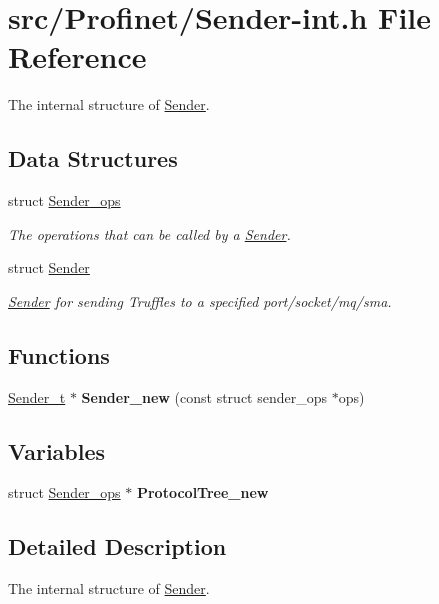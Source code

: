 \hypertarget{_sender-int_8h}{}\section{src/\+Profinet/\+Sender-\/int.h File Reference}
\label{_sender-int_8h}


The internal structure of \hyperlink{struct_sender}{Sender}.  


\subsection*{Data Structures}
\begin{DoxyCompactItemize}
\item 
struct \hyperlink{struct_sender__ops}{Sender\+\_\+ops}
\begin{DoxyCompactList}\small\item\em The operations that can be called by a \hyperlink{struct_sender}{Sender}. \end{DoxyCompactList}\item 
struct \hyperlink{struct_sender}{Sender}
\begin{DoxyCompactList}\small\item\em \hyperlink{struct_sender}{Sender} for sending Truffles to a specified port/socket/mq/sma. \end{DoxyCompactList}\end{DoxyCompactItemize}
\subsection*{Functions}
\begin{DoxyCompactItemize}
\item 
\hypertarget{_sender-int_8h_a8fd47a704efa4b163bce4835be401bd9}{}\hyperlink{struct_sender}{Sender\+\_\+t} $\ast$ {\bfseries Sender\+\_\+new} (const struct sender\+\_\+ops $\ast$ops)\label{_sender-int_8h_a8fd47a704efa4b163bce4835be401bd9}

\end{DoxyCompactItemize}
\subsection*{Variables}
\begin{DoxyCompactItemize}
\item 
\hypertarget{_sender-int_8h_aeda9b8cd79a841683977a04b7e28c195}{}struct \hyperlink{struct_sender__ops}{Sender\+\_\+ops} $\ast$ {\bfseries Protocol\+Tree\+\_\+new}\label{_sender-int_8h_aeda9b8cd79a841683977a04b7e28c195}

\end{DoxyCompactItemize}


\subsection{Detailed Description}
The internal structure of \hyperlink{struct_sender}{Sender}. 

